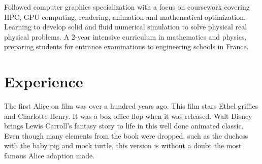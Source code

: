 \documentclass[letterpaper]{twentysecondcv} %
\begin{document}
\begin{twenty} %
	{Followed computer graphics specialization with a focus on coursework covering HPC, GPU computing, rendering, animation and mathematical optimization. }
	{Learning to develop solid and fluid numerical simulation to solve physical real physical problems.}
	{A 2-year intensive curriculum in mathematics and physics, preparing students for entrance examinations to engineering schools in France.}
\end{twenty}


\section{Experience}

\begin{twenty} %
	{The first Alice on film was over a hundred years ago.}
	{This film stars Ethel griffies and Charlotte Henry. It was a box office flop when it was released.}
	{Walt Disney brings Lewis Carroll's fantasy story to life in this well done animated classic. Even though many elements from the book were dropped, such as the duchess with the baby pig and mock turtle, this version is without a doubt the most famous Alice adaption made.}
\end{twenty}

\end{document}
